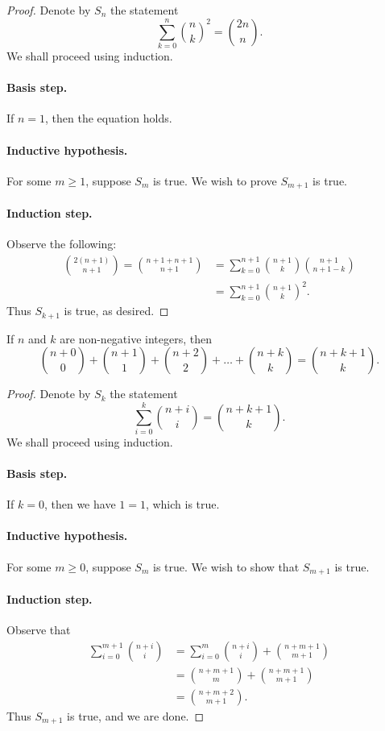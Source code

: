 \documentclass{exam}
\begin{document}
\begin{proof}
    Denote by $S_n$ the statement $$\sum_{k=0}^n\binom n k^2=\binom{2n}n.$$ We shall proceed using induction.

    \paragraph{Basis step.} If $n=1$, then the equation holds.

    \paragraph{Inductive hypothesis.} For some $m\ge1$, suppose $S_m$ is true. We wish to prove $S_{m+1}$ is true.

    \paragraph{Induction step.} Observe the following:
    \begin{align*}
        \binom{2(n+1)}{n+1} = \binom{n+1+n+1}{n+1} &= \sum_{k=0}^{n+1}\binom{n+1}k\binom{n+1}{n+1-k} \tag{Prop. 10.38}\\
        &=\sum_{k=0}^{n+1}\binom{n+1}k^2.
    \end{align*}
    Thus $S_{k+1}$ is true, as desired.
\end{proof}

\begin{proposition}{10.41}
    If $n$ and $k$ are non-negative integers, then $$\binom{n+0}0+\binom{n+1}1+\binom{n+2}2+\dots+\binom{n+k}k=\binom{n+k+1}k.$$
\end{proposition}

\begin{proof}
    Denote by $S_k$ the statement $$\sum_{i=0}^k\binom{n+i}i = \binom{n+k+1}k.$$ We shall proceed using induction.

    \paragraph{Basis step.} If $k=0$, then we have $1 = 1$, which is true.

    \paragraph{Inductive hypothesis.} For some $m\ge0$, suppose $S_m$ is true. We wish to show that $S_{m+1}$ is true.

    \paragraph{Induction step.} Observe that
    \begin{align*}
        \sum_{i=0}^{m+1}\binom{n+i}i &= \sum_{i=0}^m\binom{n+i}i + \binom{n+m+1}{m+1}\\
        &=\binom{n+m+1}{m}+\binom{n+m+1}{m+1}\\
        &=\binom{n+m+2}{m+1}.
    \end{align*}
    Thus $S_{m+1}$ is true, and we are done.
\end{proof}
\end{document}
